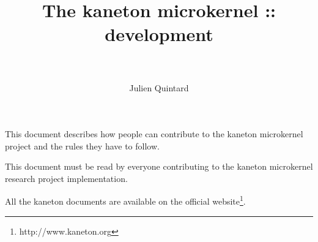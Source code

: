%
%
%
%
%
%

%
%

%
%

\def\path{../..}

%
%



%
%

\rhead{}

%
%

\title{The kaneton microkernel :: development \\
       \version \\
       \logos}

%
%

\author{\small{Julien Quintard}}

%
%



%
%

\maketitle

%
%

This document describes how people can contribute to the kaneton microkernel
project and the rules they have to follow.

\-

This document must be read by everyone contributing to the kaneton
microkernel research project implementation.

\-

All the kaneton documents are available on
  the official website\footnote{http://www.kaneton.org}.

%
%

\toc

%
%











